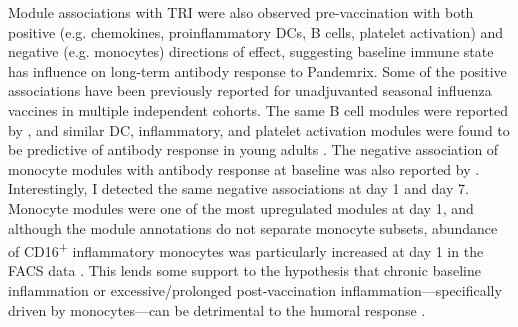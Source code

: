 Module associations with \gls{TRI} were also observed pre-vaccination with both positive (e.g. chemokines, proinflammatory \glspl{DC}, B cells, platelet activation) and negative (e.g. monocytes) directions of effect, suggesting baseline immune state has influence on long-term antibody response to Pandemrix.
Some of the positive associations have been previously reported for unadjuvanted seasonal influenza vaccines in multiple independent cohorts.
The same B cell modules were reported by \textcite{nakaya2015SystemsAnalysisImmunity}, 
and similar \gls{DC}, inflammatory, and platelet activation modules were found to be predictive of antibody response in young adults \autocite{hipc-chisignaturesprojectteam2017MulticohortAnalysisReveals}.
The negative association of monocyte modules with antibody response at baseline was also reported by \textcite{nakaya2015SystemsAnalysisImmunity}.
Interestingly, I detected the same negative associations at day 1 and day 7.
Monocyte modules were one of the most upregulated modules at day 1,
and although the module annotations do not separate monocyte subsets,
abundance of CD16\textsuperscript{+} inflammatory monocytes was particularly increased at day 1 in the \gls{FACS} data \autocite{sobolev2016AdjuvantedInfluenzaH1N1Vaccination}.
This lends some support to the hypothesis that chronic baseline inflammation or excessive/prolonged post-vaccination inflammation---specifically driven by monocytes---can be detrimental to the humoral response \autocite{mitchell2012SuppressionVaccineImmunity,mohanty2015ProlongedProinflammatoryCytokine,nakaya2015SystemsAnalysisImmunity}.

%

